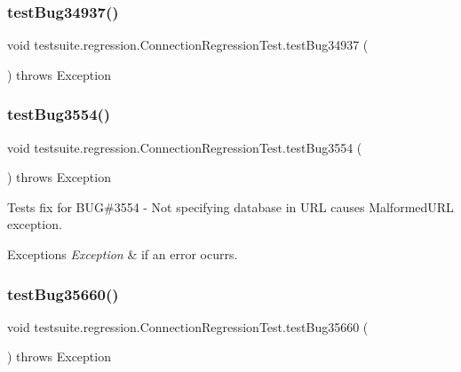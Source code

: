 \subsubsection{\texorpdfstring{test\+Bug34937()}{testBug34937()}}
{\footnotesize\ttfamily void testsuite.\+regression.\+Connection\+Regression\+Test.\+test\+Bug34937 (\begin{DoxyParamCaption}{ }\end{DoxyParamCaption}) throws Exception}

\mbox{\label{classtestsuite_1_1regression_1_1_connection_regression_test_a37a5b68fc2ee7b632c08744bc7579f29}} 
\subsubsection{\texorpdfstring{test\+Bug3554()}{testBug3554()}}
{\footnotesize\ttfamily void testsuite.\+regression.\+Connection\+Regression\+Test.\+test\+Bug3554 (\begin{DoxyParamCaption}{ }\end{DoxyParamCaption}) throws Exception}

Tests fix for B\+UG\#3554 -\/ Not specifying database in U\+RL causes Malformed\+U\+RL exception.


\begin{DoxyExceptions}{Exceptions}
{\em Exception} & if an error ocurrs. \\
\hline
\end{DoxyExceptions}
\mbox{\label{classtestsuite_1_1regression_1_1_connection_regression_test_ab72404e11448db0f3fe1d4ecf3d5efe1}} 
\subsubsection{\texorpdfstring{test\+Bug35660()}{testBug35660()}}
{\footnotesize\ttfamily void testsuite.\+regression.\+Connection\+Regression\+Test.\+test\+Bug35660 (\begin{DoxyParamCaption}{ }\end{DoxyParamCaption}) throws Exception}

